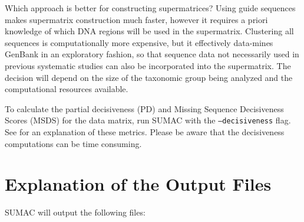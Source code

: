 \documentclass[10pt]{report}
\begin{document}
Which approach is better for constructing supermatrices?
Using guide sequences makes supermatrix construction much faster, however
it requires a priori knowledge of which DNA regions will be used
in the supermatrix.
Clustering all sequences is computationally
more expensive, but it effectively data-mines GenBank in an exploratory
fashion, so that sequence data not necessarily used in previous systematic
studies can also be incorporated into the supermatrix.
The decision will depend on the size of the taxonomic group being
analyzed and the computational resources available.

To calculate the partial decisiveness (PD) and Missing Sequence Decisiveness Scores (MSDS)
for the data matrix, run SUMAC with the \texttt{--decisiveness} flag.
See \citet{sumac} for an explanation of these metrics.
Please be aware that the decisiveness computations can be time consuming.

\section{Explanation of the Output Files}

SUMAC will output the following files:
\end{document}
